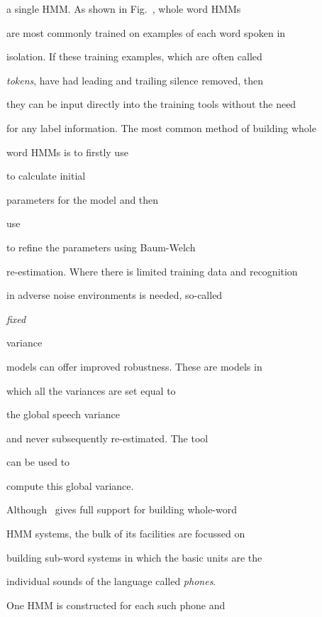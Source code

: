 a  single HMM.  As shown in Fig.~\href{f:isoword}, whole word HMMs


are most commonly trained on examples of each word spoken in


isolation.  If these training examples, which are often called


\textit{tokens}, have had leading and trailing silence removed, then


they can be input directly into the training tools without the need


for any label information. The most common method of building whole


word HMMs is to firstly use


 to calculate initial 


parameters for the model and then


use


 to refine the parameters using Baum-Welch


re-estimation. Where there is limited training data and recognition


in adverse noise environments is needed, so-called {\it fixed


variance} models can offer improved robustness. These are models in


which all the variances are set equal to 


the global speech variance


and never subsequently re-estimated.  The tool


 can be used to 


compute this global variance.












Although \HTK\ gives full support for building whole-word


HMM systems, the bulk of its facilities are focussed on 


building sub-word systems in which the basic units are the


individual sounds of the language called \textit{phones}.


One HMM is constructed for each such phone and 


